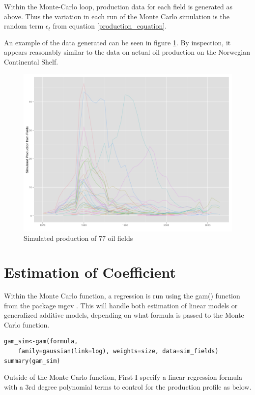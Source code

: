 \documentclass[12pt]{article}
\begin{document}
Within the Monte-Carlo loop, production data for each field is generated as above.  Thus the variation in each run of the Monte Carlo simulation is the random term $\epsilon_t$ from equation \ref{production_equation}. 

An example of the data generated can be seen in figure \ref{simulated_production}.  By inspection, it appears reasonably similar to the data on actual oil production on the Norwegian Continental Shelf.  

\begin{figure}
	\includegraphics[width=1\textwidth]{figures/simulated_production.png}
	\caption{Simulated production of 77 oil fields}
	\label{simulated_production}	
\end{figure}


\section{Estimation of Coefficient}

Within the Monte Carlo function, a regression is run using the gam() function from the package mgcv \citet{wood_generalized_2006}.  This will handle both estimation of linear models or generalized additive models, depending on what formula is passed to the Monte Carlo function.  

\begin{verbatim}
gam_sim<-gam(formula,
	family=gaussian(link=log), weights=size, data=sim_fields)
summary(gam_sim)
\end{verbatim}

Outside of the Monte Carlo function, First I specify a linear regression formula with a 3rd degree polynomial terms to control for the production profile as below.  
\end{document}
